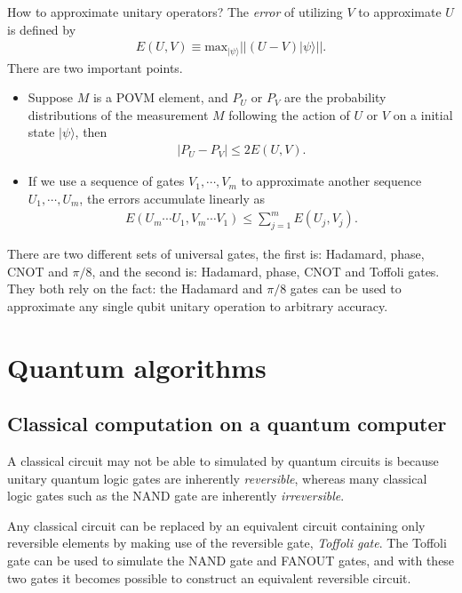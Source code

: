 \documentclass{article}
\newcommand{\ket}[1]{| #1 \rangle}  %
\begin{document}
How to approximate unitary operators? The \textit{error} of utilizing $V$ to approximate $U$ is defined by 
\begin{align}
	E(U,V)\equiv \text{max}_{\ket{\psi}} ||(U-V)\ket{\psi}||.
\end{align}
There are two important points.
\begin{itemize}
	\item Suppose $M$ is a POVM element, and $P_U$ or $P_V$ are the probability distributions of the measurement $M$ following the action of $U$ or $V$ on a initial state $\ket{\psi}$, then
	\begin{align}
		|P_U-P_V|\le 2E(U,V).
	\end{align}


	\item If we use a sequence of gates $V_1, \cdots, V_m$ to approximate another sequence $U_1, \cdots, U_m$, the errors accumulate linearly as
	\begin{align}
		E(U_m\cdots U_1, V_m\cdots V_1) \le \sum_{j=1}^m E(U_j, V_j).
	\end{align}

\end{itemize}

There are two different sets of universal gates, the first is: Hadamard, phase, CNOT and $\pi/8$, and the second is: Hadamard, phase, CNOT and Toffoli gates. They both rely on the fact: the Hadamard and $\pi/8$ gates can be used to approximate any single qubit unitary operation to arbitrary accuracy.




\section{Quantum algorithms}

\subsection{Classical computation on a quantum computer}
A classical circuit may not be able to simulated by quantum circuits is because unitary quantum logic gates are inherently \textit{reversible}, whereas many classical logic gates such as the NAND gate are inherently \textit{irreversible}.

Any classical circuit can be replaced by an equivalent circuit containing only reversible elements by making use of the reversible gate, \textit{Toffoli gate}. The Toffoli gate can be used to simulate the NAND gate and FANOUT gates, and with these two gates it becomes possible to construct an equivalent reversible circuit.
\end{document}
